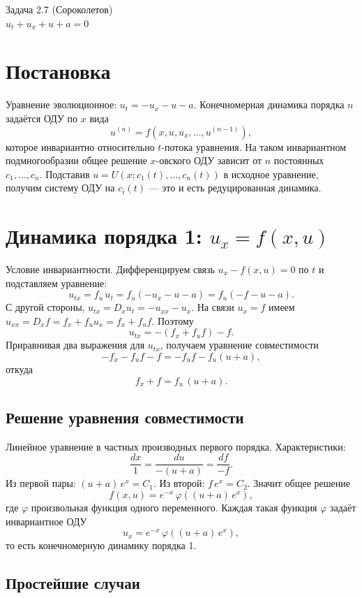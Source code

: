 \documentclass[12pt]{article}
\begin{document}
\begin{center}
{\large Задача 2.7 (Сороколетов)}\\[4pt]
$u_t + u_x + u + a = 0$
\end{center}

\section*{Постановка}

Уравнение эволюционное: $u_t = -u_x - u - a$. Конечномерная динамика порядка $n$ задаётся ОДУ по $x$ вида
\[
u^{(n)} = f(x, u, u_x, \dots, u^{(n-1)}),
\]
которое инвариантно относительно $t$-потока уравнения. На таком инвариантном подмногообразии общее решение $x$-овского ОДУ зависит от $n$ постоянных $c_1, \dots, c_n$. Подставив $u = U(x; c_1(t), \dots, c_n(t))$ в исходное уравнение, получим систему ОДУ на $c_i(t)$ — это и есть редуцированная динамика.

\section*{Динамика порядка 1: $u_x = f(x, u)$}

Условие инвариантности. Дифференцируем связь $u_x - f(x,u) = 0$ по $t$ и подставляем уравнение:
\[
u_{tx} = f_u \, u_t = f_u(-u_x - u - a) = f_u(-f - u - a).
\]
С другой стороны, $u_{tx} = D_x u_t = -u_{xx} - u_x$. На связи $u_x = f$ имеем $u_{xx} = D_x f = f_x + f_u u_x = f_x + f_u f$. Поэтому
\[
u_{tx} = -(f_x + f_u f) - f.
\]
Приравнивая два выражения для $u_{tx}$, получаем уравнение совместимости
\[
-f_x - f_u f - f = -f_u f - f_u(u + a),
\]
откуда
\[
\boxed{\; f_x + f = f_u\,(u + a). \;}
\]

\subsection*{Решение уравнения совместимости}

Линейное уравнение в частных производных первого порядка. Характеристики:
\[
\frac{dx}{1} = \frac{du}{-(u+a)} = \frac{df}{-f}.
\]
Из первой пары: $(u+a)\, e^{x} = C_1$. Из второй: $f\, e^{x} = C_2$. Значит общее решение
\[
f(x,u) = e^{-x}\, \varphi\!\left((u+a)\, e^{x}\right),
\]
где $\varphi$ произвольная функция одного переменного. Каждая такая функция $\varphi$ задаёт инвариантное ОДУ
\[
u_x = e^{-x}\, \varphi\!\left((u+a)\, e^{x}\right),
\]
то есть конечномерную динамику порядка 1.

\subsection*{Простейшие случаи}
\end{document}
